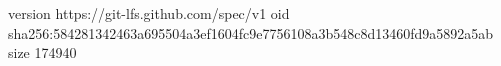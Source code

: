 version https://git-lfs.github.com/spec/v1
oid sha256:584281342463a695504a3ef1604fc9e7756108a3b548c8d13460fd9a5892a5ab
size 174940

